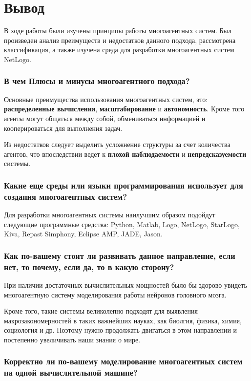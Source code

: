 \documentclass[14pt,a4paper,report]{report}
\begin{document}
\section{Вывод}

В ходе работы были изучены принципы работы многоагентных систем. Был произведен анализ преимуществ и недостатков данного подхода, рассмотрена классификация, а также изучена среда для разработки многоагентных систем NetLogo.

\subsubsection{В чем Плюсы и минусы многоагентного подхода?}

Основные преимущества использования многоагентных систем, это: \textbf{распределенные вычисления}, \textbf{масштабирование} и \textbf{автономность}. Кроме того агенты могут общаться между собой, обмениваться информацией и кооперироваться для выполнения задач.

Из недостатков следует выделить усложнение структуры за счет количества агентов, что впоследствии ведет к \textbf{плохой наблюдаемости} и \textbf{непредсказуемости} системы.

\subsubsection{Какие еще среды или языки программирования использует для создания многоагентных систем?}

Для разработки многоагентных системы наилучшим образом подойдут следующие программные средства: Python, Matlab, Logo, NetLogo, StarLogo, Kiva, Repast Simphony, Eclipse AMP, JADE, Jason.

\subsubsection{Как по-вашему стоит ли развивать данное направление, если нет, то почему, если да, то в какую сторону?}

При наличии достаточных вычислительных мощностей было бы здорово увидеть многоагентную систему моделирования работы нейронов головного мозга.

Кроме того, такие системы великолепно подходят для выявления макрозакономерностей в таких важнейших науках, как биолгия, физика, химия, социология и др. Поэтому нужно продолжать двигаться в этом направлении и постепенно увеличивать наши знания о мире.

\subsubsection{Корректно ли по-вашему моделирование многоагентных систем на одной вычислительной машине?}
\end{document}
